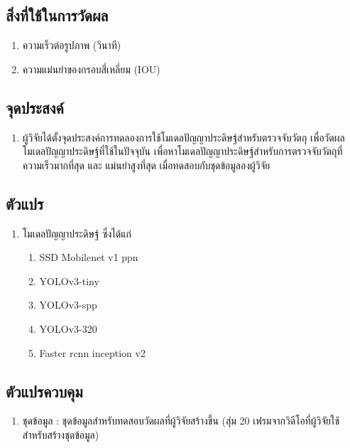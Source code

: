 \subsection*{สิ่งที่ใช้ในการวัดผล}
	\begin{enumerate}
		\item ความเร็วต่อรูปภาพ (วินาที)
		\item ความแม่นยำของกรอบสี่เหลี่ยม (IOU)
	\end{enumerate}
\subsection*{จุดประสงค์}
	\begin{enumerate}
		\item ผู้วิจัยได้ตั้งจุดประสงค์การทดลองการใช้โมเดลปัญญาประดิษฐ์สำหรับตรวจจับวัตถุ เพื่อวัดผลโมเดลปัญญาประดิษฐ์ที่ใช้ในปัจจุบัน
เพื่อหาโมเดลปัญญาประดิษฐ์สำหรับการตรวจจับวัตถุที่ความเร็วมากที่สุด และ แม่นยำสูงที่สุด เมื่อทดสอบกับชุดข้อมูลองผู้วิจัย
	\end{enumerate}
\subsection*{ตัวแปร}
	\begin{enumerate}
		\item โมเดลปัญญาประดิษฐ์ ซึ่งได้แก่
		\begin{enumerate}
			\item SSD Mobilenet v1 ppn
			\item YOLOv3-tiny
			\item YOLOv3-spp	
			\item YOLOv3-320
			\item Faster rcnn inception v2
		\end{enumerate}
	\end{enumerate}
\subsection*{ตัวแปรควบคุม}
	\begin{enumerate}
		\item ชุดข้อมูล : ชุดข้อมูลสำหรับทดสอบวัดผลที่ผู้วิจัยสร้างขึ้น (สุ่ม 20 เฟรมจากวิดีโอที่ผู้วิจัยใช้สำหรับสร้างชุดข้อมูล)
	\end{enumerate}
